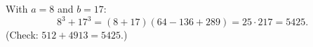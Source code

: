 With $a=8$ and $b=17$:
\[8^3+17^3=(8+17)\left(64-136+289\right)=25\cdot217=\boxed{5425}.\]
(Check: $512+4913=5425$.)
